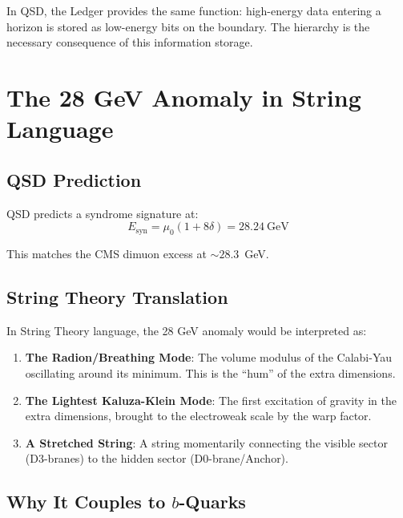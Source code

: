 \documentclass[11pt,a4paper]{article}
\theoremstyle{definition}
\newcommand{\dgeo}{\delta}
\newcommand{\murad}{\mu_0}
\begin{document}
In QSD, the Ledger provides the same function: high-energy data entering a horizon is stored as low-energy bits on the boundary. The hierarchy is the necessary consequence of this information storage.

\section{The 28 GeV Anomaly in String Language}
\label{sec:anomaly}

\subsection{QSD Prediction}

QSD predicts a syndrome signature at:
\begin{equation}
E_{\text{syn}} = \murad(1 + 8\dgeo) = 28.24~\text{GeV}
\end{equation}

This matches the CMS dimuon excess at $\sim 28.3$~GeV.

\subsection{String Theory Translation}

In String Theory language, the 28 GeV anomaly would be interpreted as:

\begin{enumerate}
    \item \textbf{The Radion/Breathing Mode}: The volume modulus of the Calabi-Yau oscillating around its minimum. This is the ``hum'' of the extra dimensions.
    
    \item \textbf{The Lightest Kaluza-Klein Mode}: The first excitation of gravity in the extra dimensions, brought to the electroweak scale by the warp factor.
    
    \item \textbf{A Stretched String}: A string momentarily connecting the visible sector (D3-branes) to the hidden sector (D0-brane/Anchor).
\end{enumerate}

\subsection{Why It Couples to $b$-Quarks}
\end{document}
